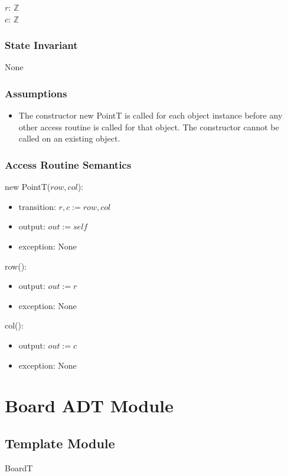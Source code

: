 \documentclass[12pt]{article}
\begin{document}
$r$: $\mathbb{Z}$ \\
$c$: $\mathbb{Z}$

\subsubsection* {State Invariant}
None

\subsubsection* {Assumptions}
\begin{itemize}
    \item The constructor new PointT is called for each object instance before
    any other access routine is called for that object.  The constructor cannot
    be called on an existing object.
\end{itemize}

\subsubsection* {Access Routine Semantics}
new PointT($row, col$):
\begin{itemize}
    \item transition: $r, c := row, col$
    \item output: $out := \mathit{self}$
    \item exception: None
\end{itemize}

\noindent row():
\begin{itemize}
    \item output: $out := r$
    \item exception: None
\end{itemize}

\noindent col():
\begin{itemize}
    \item output: $out := c$
    \item exception: None
\end{itemize}



\newpage
\section* {Board ADT Module}
\subsection*{Template Module}
BoardT
\end{document}
